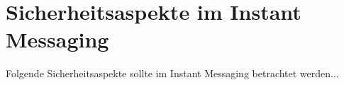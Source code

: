 \section{Sicherheitsaspekte im Instant Messaging}
Folgende Sicherheitsaspekte sollte im Instant Messaging betrachtet werden...